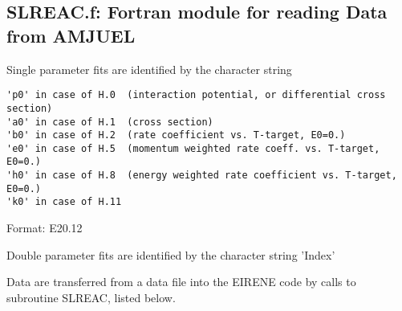 \documentclass[12pt,dvipdfmx]{article}
\begin{document}
\subsection{SLREAC.f: Fortran module for reading Data from AMJUEL}\label{sec1.2}
Single parameter fits are identified by the character string
\begin{small}\begin{verbatim}
'p0' in case of H.0  (interaction potential, or differential cross section)
'a0' in case of H.1  (cross section)
'b0' in case of H.2  (rate coefficient vs. T-target, E0=0.)
'e0' in case of H.5  (momentum weighted rate coeff. vs. T-target, E0=0.)
'h0' in case of H.8  (energy weighted rate coefficient vs. T-target, E0=0.)
'k0' in case of H.11
\end{verbatim}\end{small}
Format: E20.12

Double parameter fits are identified by the character string
'Index'


Data are transferred from a data file into the EIRENE code by
calls to subroutine SLREAC, listed below.
\end{document}
